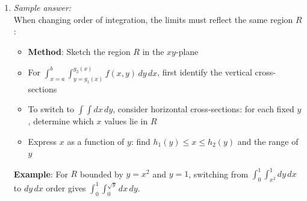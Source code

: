 \documentclass[11pt]{article}
\begin{document}
\begin{enumerate}[label=\textbf{\arabic*.}]
  \item \emph{Sample answer:}\\
  When changing order of integration, the limits must reflect the same region $R$:
  \begin{itemize}
    \item \textbf{Method}: Sketch the region $R$ in the $xy$-plane
    \item For $\int_{x=a}^{b} \int_{y=g_1(x)}^{g_2(x)} f(x,y)\, dy\, dx$, first identify the vertical 
    cross-sections
    \item To switch to $\int \int dx\, dy$, consider horizontal cross-sections: for each fixed $y$, 
    determine which $x$ values lie in $R$
    \item Express $x$ as a function of $y$: find $h_1(y) \leq x \leq h_2(y)$ and the range of $y$
  \end{itemize}
  \textbf{Example}: For $R$ bounded by $y = x^2$ and $y = 1$, switching from 
  $\int_0^1 \int_{x^2}^1 dy\,dx$ to $dy\,dx$ order gives $\int_0^1 \int_0^{\sqrt{y}} dx\,dy$.

\end{enumerate}
\end{document}
